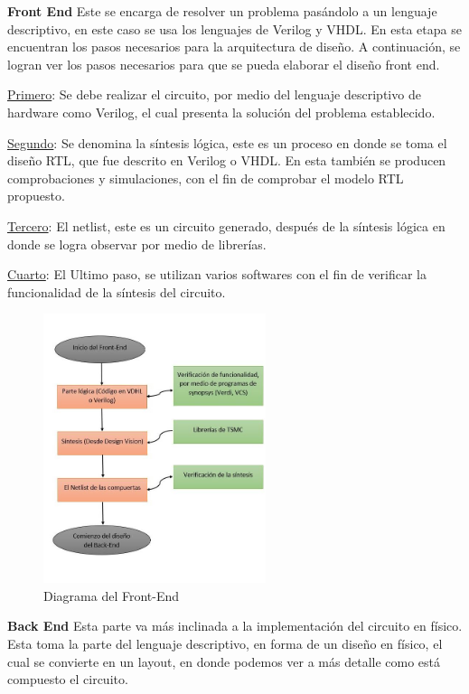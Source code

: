  \textbf{Front End}
 Este se encarga de resolver un problema pasándolo a un lenguaje descriptivo, en este caso se usa los lenguajes de Verilog y VHDL. 
 En esta etapa se encuentran los pasos necesarios para la arquitectura de diseño. A continuación, se logran ver los pasos necesarios para que se pueda elaborar el diseño front end.
 
 \underline{Primero}: Se debe realizar el circuito, por medio del lenguaje descriptivo de hardware como Verilog, el cual presenta la solución del problema establecido.
 
 \underline{Segundo}:  Se denomina la síntesis lógica, este es un proceso en donde se toma el diseño RTL, que fue descrito en Verilog o VHDL. En esta también se producen comprobaciones y simulaciones, con el fin de comprobar el modelo RTL propuesto.
 
 \underline{Tercero}: El netlist, este es un circuito generado, después de la síntesis lógica en donde se logra observar  por medio de librerías.
 
 \underline{Cuarto}: El Ultimo paso, se utilizan varios softwares con el fin de verificar la funcionalidad de la síntesis del circuito.


 \cite{charls} 


 \begin{figure}[h]
    \centering
    \includegraphics[width=0.58\textwidth]{figuras/Font.JPG}
    \caption{Diagrama del Front-End}
    \label{fig:mesh1}
\end{figure}
 
 

 
 
 \textbf{Back End} 
Esta parte va más inclinada a la implementación del circuito en físico. Esta toma la parte del lenguaje descriptivo, en forma de un diseño en físico, el cual se convierte en un layout, en donde podemos ver a más detalle como está compuesto el circuito.

